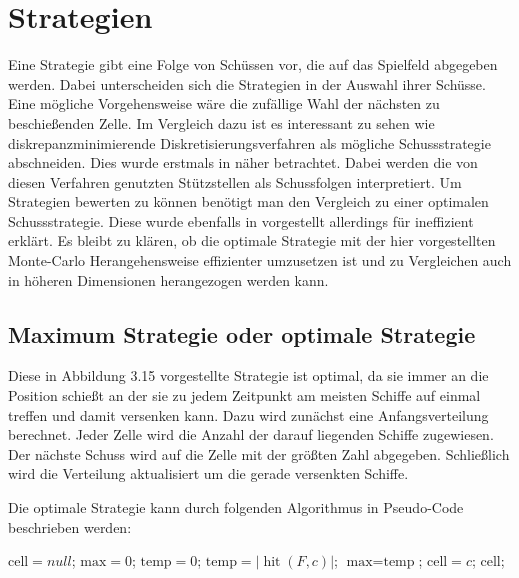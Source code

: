 \documentclass[a4paper,12pt]{llncs}
\numberwithin{equation}{section}
\DeclareMathOperator{\hit}{hit}
\begin{document}
\section{Strategien}


Eine Strategie gibt eine Folge von Schüssen vor, die auf das Spielfeld abgegeben werden. Dabei unterscheiden sich die Strategien in der Auswahl ihrer Schüsse. Eine mögliche Vorgehensweise wäre die zufällige Wahl der nächsten zu beschießenden Zelle. Im Vergleich dazu ist es interessant zu sehen wie diskrepanzminimierende Diskretisierungsverfahren als mögliche Schussstrategie abschneiden. Dies wurde erstmals in \cite{M13} näher betrachtet. Dabei werden die von diesen Verfahren genutzten Stützstellen als Schussfolgen interpretiert. Um Strategien bewerten zu können benötigt man den Vergleich zu einer optimalen Schussstrategie. Diese wurde ebenfalls in \cite{M13} vorgestellt allerdings für ineffizient erklärt. Es bleibt zu klären, ob die optimale Strategie mit der hier vorgestellten Monte-Carlo Herangehensweise effizienter umzusetzen ist und zu Vergleichen auch in höheren Dimensionen herangezogen werden kann.


\subsection{Maximum Strategie oder optimale Strategie}

Diese in \cite{M13} Abbildung 3.15 vorgestellte Strategie ist optimal, da sie immer an die Position schießt an der sie zu jedem Zeitpunkt am meisten Schiffe auf einmal treffen und damit versenken kann. Dazu wird zunächst eine Anfangsverteilung berechnet. Jeder Zelle wird die Anzahl der darauf liegenden Schiffe zugewiesen. Der nächste Schuss wird auf die Zelle mit der größten Zahl abgegeben. Schließlich wird die Verteilung aktualisiert um die gerade versenkten Schiffe.

Die optimale Strategie kann durch folgenden Algorithmus in Pseudo-Code beschrieben werden:

\begin{tcolorbox}
	\begin{algorithmic}
		\State $\text{cell} = null$;
		\State $\text{max} = 0$;
		\State $\text{temp} = 0$;
		\State $\text{temp}=\left|\hit(F,c)\right|$;
		\State $\text{max}=\text{temp}$;
		\State $\text{cell} = c$;
		\EndIf
		\EndFor
		\State \Return $\text{cell}$;
		\EndFunction
	\end{algorithmic}
\end{tcolorbox}
\end{document}
